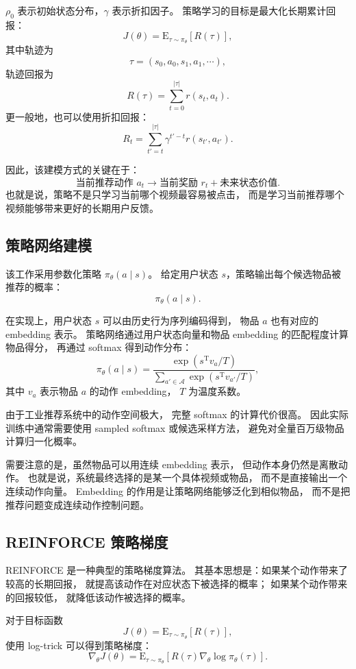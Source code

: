 \documentclass[11pt]{ctexart}
\begin{document}
$\rho_0$ 表示初始状态分布，$\gamma$ 表示折扣因子。
策略学习的目标是最大化长期累计回报：
\[
J(\theta)
=
\mathrm{E}_{\tau\sim \pi_{\theta}}
\left[
R(\tau)
\right],
\]
其中轨迹为
\[
\tau=(s_0,a_0,s_1,a_1,\cdots),
\]
轨迹回报为
\[
R(\tau)
=
\sum_{t=0}^{|\tau|} r(s_t,a_t).
\]
更一般地，也可以使用折扣回报：
\[
R_t
=
\sum_{t'=t}^{|\tau|}
\gamma^{t'-t}r(s_{t'},a_{t'}).
\]

因此，该建模方式的关键在于：
\[
\text{当前推荐动作 }a_t
\rightarrow
\text{当前奖励 }r_t
+
\text{未来状态价值}.
\]
也就是说，策略不是只学习当前哪个视频最容易被点击，
而是学习当前推荐哪个视频能够带来更好的长期用户反馈。

\subsection{策略网络建模}

该工作采用参数化策略 $\pi_{\theta}(a\mid s)$。
给定用户状态 $s$，策略输出每个候选物品被推荐的概率：
\[
\pi_{\theta}(a\mid s).
\]

在实现上，用户状态 $s$ 可以由历史行为序列编码得到，
物品 $a$ 也有对应的 embedding 表示。
策略网络通过用户状态向量和物品 embedding 的匹配程度计算物品得分，
再通过 softmax 得到动作分布：
\[
\pi_{\theta}(a\mid s)
=
\frac{
\exp(s^{\mathrm{T}}v_a / T)
}{
\sum_{a'\in\mathcal{A}}
\exp(s^{\mathrm{T}}v_{a'} / T)
},
\]
其中 $v_a$ 表示物品 $a$ 的动作 embedding，
$T$ 为温度系数。

由于工业推荐系统中的动作空间极大，
完整 softmax 的计算代价很高。
因此实际训练中通常需要使用 sampled softmax 或候选采样方法，
避免对全量百万级物品计算归一化概率。

需要注意的是，虽然物品可以用连续 embedding 表示，
但动作本身仍然是离散动作。
也就是说，系统最终选择的是某一个具体视频或物品，
而不是直接输出一个连续动作向量。
Embedding 的作用是让策略网络能够泛化到相似物品，
而不是把推荐问题变成连续动作控制问题。

\subsection{REINFORCE 策略梯度}

REINFORCE 是一种典型的策略梯度算法。
其基本思想是：如果某个动作带来了较高的长期回报，
就提高该动作在对应状态下被选择的概率；
如果某个动作带来的回报较低，
就降低该动作被选择的概率。

对于目标函数
\[
J(\theta)
=
\mathrm{E}_{\tau\sim \pi_{\theta}}
\left[
R(\tau)
\right],
\]
使用 log-trick 可以得到策略梯度：
\[
\nabla_{\theta}J(\theta)
=
\mathrm{E}_{\tau\sim \pi_{\theta}}
\left[
R(\tau)\nabla_{\theta}\log \pi_{\theta}(\tau)
\right].
\]
\end{document}
